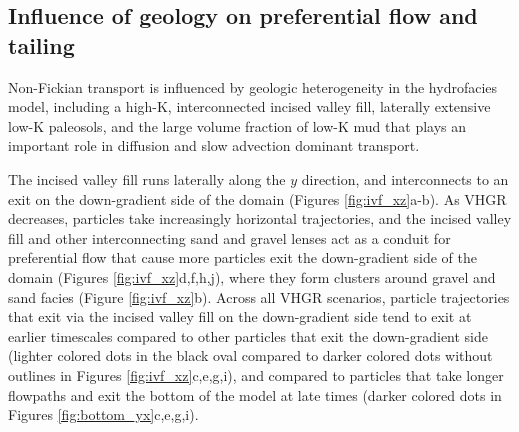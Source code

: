 %
%
\subsection{Influence of geology on preferential flow and tailing}
\label{ss_3_4}

Non-Fickian transport is influenced by geologic heterogeneity in the hydrofacies model, including a high-K, interconnected incised valley fill, laterally extensive low-K paleosols, and the large volume fraction of low-K mud that plays an important role in diffusion and slow advection dominant transport.

The incised valley fill runs laterally along the $y$ direction, and interconnects to an exit on the down-gradient side of the domain (Figures \ref{fig:ivf_xz}a-b). As VHGR decreases, particles take increasingly horizontal trajectories, and the incised valley fill and other interconnecting sand and gravel lenses act as a conduit for preferential flow that cause more particles exit the down-gradient side of the domain (Figures \ref{fig:ivf_xz}d,f,h,j), where they form clusters around gravel and sand facies (Figure \ref{fig:ivf_xz}b). Across all VHGR scenarios, particle trajectories that exit via the incised valley fill on the down-gradient side tend to exit at earlier timescales compared to other particles that exit the down-gradient side (lighter colored dots in the black oval compared to darker colored dots without outlines in Figures \ref{fig:ivf_xz}c,e,g,i), and compared to particles that take longer flowpaths and exit the bottom of the model at late times (darker colored dots in Figures \ref{fig:bottom_yx}c,e,g,i).


